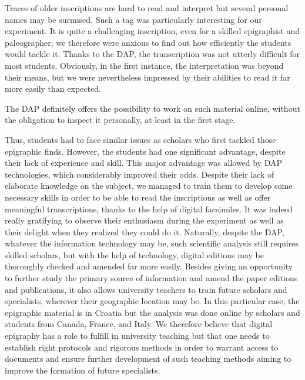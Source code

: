 \documentclass[amsthm,ebook]{saparticle}
\begin{document}
Traces of older inscriptions are hard to read and interpret but several personal names may be surmised. Such a tag was
particularly interesting for our experiment. It is quite a challenging inscription, even for a skilled epigraphist and
paleographer; we therefore were anxious to find out how efficiently the students would tackle it. Thanks to the DAP,
the transcription was not utterly difficult for most students. Obviously, in the first instance, the interpretation was
beyond their means, but we were nevertheless impressed by their abilities to read it far more easily than expected. 

\newpage
The DAP definitely offers the possibility to work on such material online, without the obligation to inspect it personally,
at least in the first stage.



Thus, students had to face similar issues as scholars who first tackled those epigraphic finds. However, the students
had one significant advantage, despite their lack of experience and skill. This major advantage was allowed by DAP
technologies, which considerably improved their odds. Despite their lack of elaborate knowledge on the subject, we
managed to train them to develop some necessary skills in order to be able to read the inscriptions as well as offer
meaningful transcriptions, thanks to the help of digital facsimiles. It was indeed really gratifying to observe their
enthusiasm during the experiment as well as their delight when they realized they could do it. Naturally, despite the
DAP, whatever the information technology may be, such scientific analysis still requires skilled scholars, but with the
help of technology, digital editions may be thoroughly checked and amended far more easily. Besides giving an
opportunity to further study the primary source of information and amend the paper editions and publications, it also
allows university teachers to train future scholars and specialists, wherever their geographic location may be. In this
particular case, the epigraphic material is in Croatia but the analysis was done online by scholars and students from
Canada, France, and Italy. We therefore believe that digital epigraphy has a role to fulfill in university teaching but
that one needs to establish right protocols and rigorous methods in order to warrant access to documents and ensure
further development of such teaching methods aiming to improve the formation of future specialists.
\end{document}
